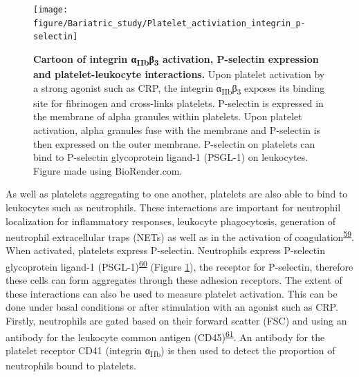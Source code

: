 \documentclass[11pt,twoside]{bristolthesis}
\begin{document}
\begin{figure}

{\centering \texttt{[image: figure/Bariatric\_study/Platelet\_activiation\_integrin\_p-selectin]} 

}

\caption[Cartoon of integrin α\textsubscript{IIb}β\textsubscript{3} activation, P-selectin expression and platelet-leukocyte interactions]{\textbf{Cartoon of integrin α\textsubscript{IIb}β\textsubscript{3} activation, P-selectin expression and platelet-leukocyte interactions.} Upon platelet activation by a strong agonist such as CRP, the integrin α\textsubscript{IIb}β\textsubscript{3} exposes its binding site for fibrinogen and cross-links platelets. P-selectin is expressed in the membrane of alpha granules within platelets. Upon platelet activation, alpha granules fuse with the membrane and P-selectin is then expressed on the outer membrane. P-selectin on platelets can bind to P-selectin glycoprotein ligand-1 (PSGL-1) on leukocytes. Figure made using BioRender.com.}\label{fig:platelet-activation-background}
\end{figure}
As well as platelets aggregating to one another, platelets are also able to bind to leukocytes such as neutrophils. These interactions are important for neutrophil localization for inflammatory responses, leukocyte phagocytosis, generation of neutrophil extracellular traps (NETs) as well as in the activation of coagulation\textsuperscript{\protect\hyperlink{ref-Lisman2018}{59}}. When activated, platelets express P-selectin. Neutrophils express P-selectin glycoprotein ligand-1 (PSGL-1)\textsuperscript{\protect\hyperlink{ref-Zarbock2007}{60}} (Figure \ref{fig:platelet-activation-background}), the receptor for P-selectin, therefore these cells can form aggregates through these adhesion receptors. The extent of these interactions can also be used to measure platelet activation. This can be done under basal conditions or after stimulation with an agonist such as CRP. Firstly, neutrophils are gated based on their forward scatter (FSC) and using an antibody for the leukocyte common antigen (CD45)\textsuperscript{\protect\hyperlink{ref-Gerrits2016}{61}}. An antibody for the platelet receptor CD41 (integrin α\textsubscript{IIb}) is then used to detect the proportion of neutrophils bound to platelets.
\end{document}
